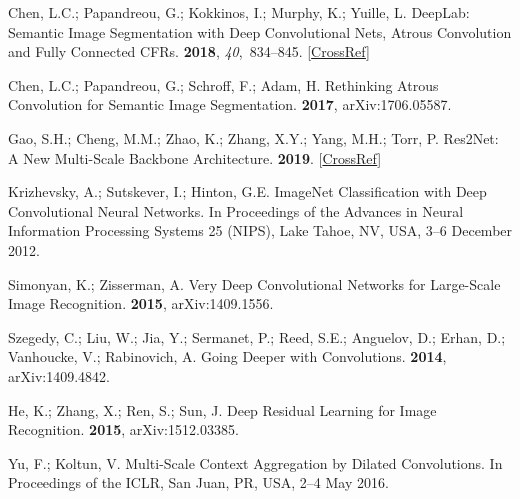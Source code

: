 \documentclass[sensors,article,accept,moreauthors,pdftex]{Definitions/mdpi}
\begin{document}
\begin{thebibliography}{999}
Chen, L.C.; Papandreou, G.; Kokkinos, I.; Murphy, K.; Yuille, L.
\newblock DeepLab: Semantic Image Segmentation with Deep Convolutional Nets,
Atrous Convolution and Fully Connected CFRs.
{\bf 2018}, {\em 40},~834--845. [\href{http://dx.doi.org/10.1109/TPAMI.2017.2699184}{CrossRef}]

Chen, L.C.; Papandreou, G.; Schroff, F.; Adam, H.
\newblock Rethinking Atrous Convolution for Semantic Image Segmentation.
 {\bf 2017}, arXiv:1706.05587.

Gao, S.H.; Cheng, M.M.; Zhao, K.; Zhang, X.Y.; Yang, M.H.; Torr, P.
\newblock Res2Net: A New Multi-Scale Backbone Architecture.
{\bf 2019}. [\href{http://dx.doi.org/10.1109/TPAMI.2019.2938758}{CrossRef}]

Krizhevsky, A.; Sutskever, I.; Hinton, G.E.
\newblock ImageNet Classification with Deep Convolutional Neural Networks.
\newblock In Proceedings of the  Advances in Neural Information Processing Systems 25 (NIPS), Lake Tahoe, NV, USA, 3--6 December 2012.   

Simonyan, K.; Zisserman, A.
\newblock Very Deep Convolutional Networks for Large-Scale Image Recognition.
 {\bf 2015}, arXiv:1409.1556.

Szegedy, C.; Liu, W.; Jia, Y.; Sermanet, P.; Reed, S.E.; Anguelov, D.; Erhan,
D.; Vanhoucke, V.; Rabinovich, A.
\newblock Going Deeper with Convolutions.
 {\bf 2014}, arXiv:1409.4842.

He, K.; Zhang, X.; Ren, S.; Sun, J.
\newblock Deep Residual Learning for Image Recognition.
 {\bf 2015}, arXiv:1512.03385.

Yu, F.; Koltun, V.
\newblock Multi-Scale Context Aggregation by Dilated Convolutions.
\newblock In Proceedings of the  ICLR, San Juan, PR, USA, 2--4 May 2016.


\end{thebibliography}
\end{document}
